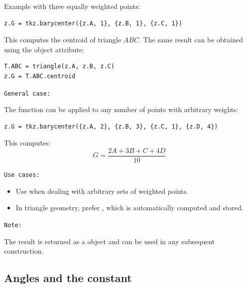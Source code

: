 \begin{center}
\end{center}


Example with three equally weighted points:
\begin{mybox}
\begin{verbatim}
z.G = tkz.barycenter({z.A, 1}, {z.B, 1}, {z.C, 1})
\end{verbatim}
\end{mybox}

This computes the centroid of triangle $ABC$. The same result can be obtained using the object attribute:

\begin{mybox}
\begin{verbatim}
T.ABC = triangle(z.A, z.B, z.C)
z.G = T.ABC.centroid
\end{verbatim}
\end{mybox}

\medskip
\texttt{General case: }

The function can be applied to any number of points with arbitrary weights:

\begin{mybox}
\begin{verbatim}
z.G = tkz.barycenter({z.A, 2}, {z.B, 3}, {z.C, 1}, {z.D, 4})
\end{verbatim}
\end{mybox}

This computes:
\[
G = \frac{2A + 3B + C + 4D}{10}
\]

\medskip
\texttt{Use cases: }

\begin{itemize}
  \item Use  when dealing with arbitrary sets of weighted points.
  \item In triangle geometry, prefer , which is automatically computed and stored.
\end{itemize}

\medskip
\texttt{Note: }

The result is returned as a  object and can be used in any subsequent construction.





\subsection{Angles and the constant }

